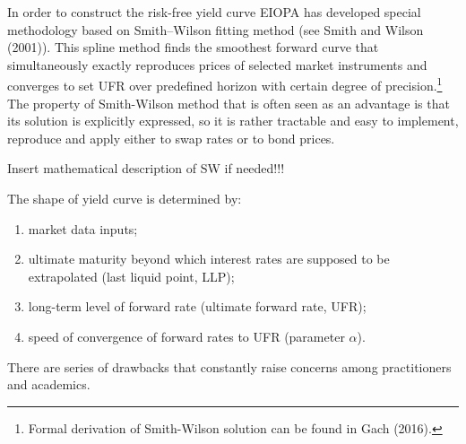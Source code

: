 	In order to construct the risk-free yield curve EIOPA has developed special methodology based on Smith--Wilson fitting method (see Smith and Wilson (2001)). 
	This spline method finds the smoothest forward curve that simultaneously exactly reproduces prices of selected market instruments and converges  to set UFR over predefined horizon with certain degree of precision.\footnote
	{
	Formal derivation of Smith-Wilson solution can be found in Gach (2016).
	} 
	The property of Smith-Wilson method that is often seen as an advantage is that its solution is explicitly expressed, so it is rather tractable and easy to implement, reproduce and apply either to swap rates or to bond prices. 
	
\bigskip
	
{\color{blue} Insert mathematical description of SW if needed!!!}

\bigskip


	The shape of yield curve is determined by:

\begin{enumerate}
	\item market data inputs;
	\item ultimate maturity beyond which interest rates are supposed to be extrapolated (last liquid point, LLP);
	\item long-term level of forward rate (ultimate forward rate,  UFR);
	\item speed of convergence of forward rates to UFR (parameter $\alpha$). 
\end{enumerate}


	There are series of drawbacks that constantly raise concerns among practitioners and academics.   	

